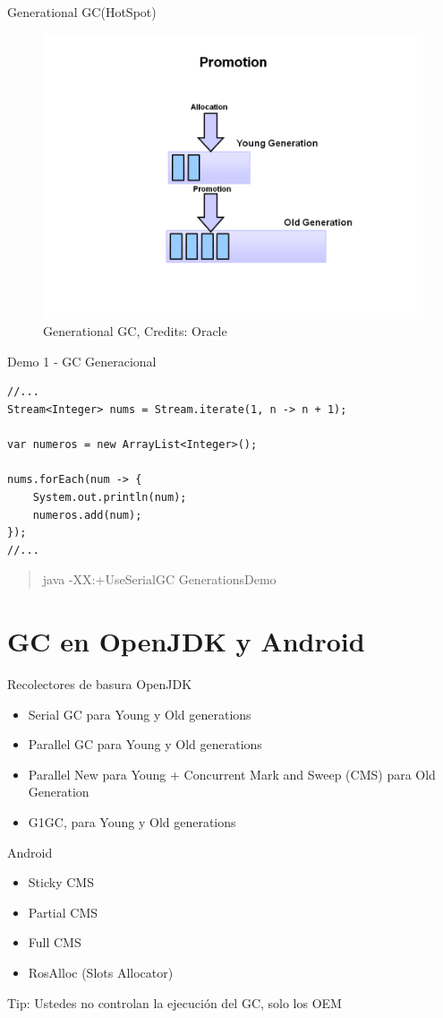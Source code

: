 \documentclass{beamer}
\begin{document}
\begin{frame}{Generational GC(HotSpot)}
\begin{figure}
	\centering
	\includegraphics[width=0.9\linewidth]{Images/generational6}
	\caption{Generational GC, Credits: Oracle}
\end{figure}
\end{frame}

\begin{frame}[fragile]{Demo 1 - GC Generacional}
\begin{lstlisting}
//...
Stream<Integer> nums = Stream.iterate(1, n -> n + 1);

var numeros = new ArrayList<Integer>();

nums.forEach(num -> {
	System.out.println(num);
	numeros.add(num);
});
//...
\end{lstlisting}
\begin{quote}
	java -XX:+UseSerialGC GenerationsDemo
\end{quote}
\end{frame}

\section{GC en OpenJDK y Android}
\begin{frame}[fragile]{Recolectores de basura}
OpenJDK
\begin{itemize}
	\item Serial GC para Young y Old generations
	\item Parallel GC para Young y Old generations
	\item Parallel New para Young + Concurrent Mark and Sweep (CMS) para Old Generation
	\item G1GC, para Young y Old generations	
\end{itemize}

Android
\begin{itemize}
	\item Sticky CMS
	\item Partial CMS
	\item Full CMS
	\item RosAlloc (Slots Allocator)
\end{itemize}

Tip: Ustedes no controlan la ejecución del GC, solo los OEM
\end{frame}
\end{document}
